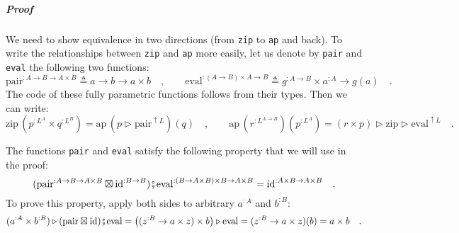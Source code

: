 \subparagraph{Proof}

We need to show equivalence in two directions (from \lstinline!zip!
to \lstinline!ap! and back). To write the relationships between \lstinline!zip!
and \lstinline!ap! more easily, let us denote by \lstinline!pair!
and \lstinline!eval! the following two functions:
\[
\text{pair}^{:A\rightarrow B\rightarrow A\times B}\triangleq a\rightarrow b\rightarrow a\times b\quad,\quad\quad\text{eval}^{:\left(A\rightarrow B\right)\times A\rightarrow B}\triangleq g^{:A\rightarrow B}\times a^{:A}\rightarrow g(a)\quad.
\]
The code of these fully parametric functions follows from their types.
Then we can write:
\[
\text{zip}\,(p^{:L^{A}}\times q^{:L^{B}})=\text{ap}\,(p\triangleright\text{pair}^{\uparrow L})(q)\quad,\quad\quad\text{ap}\,(r^{:L^{A\rightarrow B}})(p^{:L^{A}})=(r\times p)\triangleright\text{zip}\triangleright\text{eval}^{\uparrow L}\quad.
\]

The functions \lstinline!pair! and \lstinline!eval! satisfy the
following property that we will use in the proof:
\begin{equation}
(\text{pair}^{:A\rightarrow B\rightarrow A\times B}\boxtimes\text{id}^{:B\rightarrow B})\bef\text{eval}^{:\left(B\rightarrow A\times B\right)\times B\rightarrow A\times B}=\text{id}^{:A\times B\rightarrow A\times B}\quad.\label{eq:pair-and-eval-property-derivation1}
\end{equation}
To prove this property, apply both sides to arbitrary $a^{:A}$ and
$b^{:B}$:
\[
(a^{:A}\times b^{:B})\triangleright(\text{pair}\boxtimes\text{id})\bef\text{eval}=\big((z^{:B}\rightarrow a\times z)\times b\big)\triangleright\text{eval}=(z^{:B}\rightarrow a\times z)(b)=a\times b\quad.
\]

